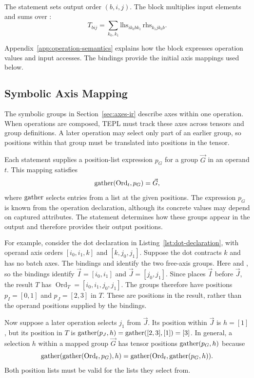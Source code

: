 The statement  sets output order $(b,i,j)$.
The  block multiplies input elements and sums over
:
\begin{equation}
 T_{b i j}=\sum_{k_0,k_1}
 \mathrm{lhs}_{i k_0 b k_1}\,\mathrm{rhs}_{k_1 j k_0 b}.
\end{equation}

Appendix~\ref{app:operation-semantics} explains how the 
block expresses operation values and input accesses.
The bindings provide the initial axis mappings used below.

\subsection{Symbolic Axis Mapping}
\label{sec:symbolic-axis-mapping}
The symbolic groups in Section~\ref{sec:axes-ir} describe axes within
one operation. When operations are composed, TEPL must track these
axes across tensors and group definitions. A later operation may select
only part of an earlier group, so positions within that group must be
translated into positions in the tensor.

Each  statement supplies a position-list expression $p_G$
for a group $\vec G$ in an operand $t$. This mapping satisfies
\begin{equation}
 \operatorname{gather}(\operatorname{Ord}_t,p_G)=\vec G,
 \label{eq:mapping}
\end{equation}
where $\operatorname{gather}$ selects entries from a list at the given positions.
The expression $p_G$ is known from the operation declaration, although
its concrete values may depend on captured attributes.
The  statement determines how these groups appear in the
output and therefore provides their output positions.

For example, consider the dot declaration in
Listing~\ref{lst:dot-declaration}, with operand axis orders
$[i_0,i_1,k]$ and $[k,j_0,j_1]$. Suppose the dot contracts $k$ and
has no batch axes. The bindings  and
 identify the two free-axis groups.
Here  and , so the bindings identify
$\vec I=[i_0,i_1]$ and $\vec J=[j_0,j_1]$.
Since  places $\vec I$ before $\vec J$,
the result $T$ has
$\operatorname{Ord}_T=[i_0,i_1,j_0,j_1]$.
The groups therefore have positions $p_I=[0,1]$ and $p_J=[2,3]$
in $T$. These are positions in the result, rather than the operand
positions supplied by the bindings.

Now suppose a later operation selects $j_1$ from $\vec J$.
Its position within $\vec J$ is $h=[1]$, but its position in $T$ is
$\operatorname{gather}(p_J,h)=\operatorname{gather}([2,3],[1])=[3]$.
In general, a selection $h$ within a mapped group $\vec G$ has
tensor positions $\operatorname{gather}(p_G,h)$ because
\begin{equation}
 \operatorname{gather}(\operatorname{gather}(\operatorname{Ord}_t,p_G),h)
 =\operatorname{gather}(\operatorname{Ord}_t,\operatorname{gather}(p_G,h)).
 \label{eq:gather-composition}
\end{equation}
Both position lists must be valid for the lists they select from.

